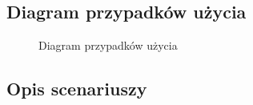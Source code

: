 \subsection{Diagram przypadków użycia}
\begin{figure}[H]
    \centering
    \caption{Diagram przypadków użycia}
\end{figure}


\subsection{Opis scenariuszy}
\begin{figure}[H]
    \centering
\end{figure}

